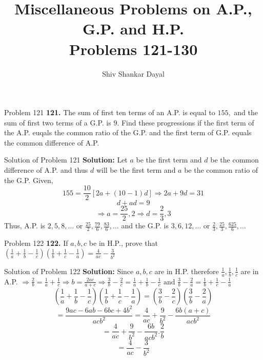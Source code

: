 \documentclass[aspectratio=1610,8pt]{beamer}
\title{Miscellaneous Problems on A.P., G.P. and H.P.\\Problems 121-130}
\author[Shiv Shankar Dayal]{Shiv Shankar Dayal}
\begin{document}
\begin{frame}
  \titlepage
\end{frame}
\begin{frame}{Problem 121}
  \textbf{121.} The sum of first ten terms of an A.P. is equal to $155,$ and the sum of first two terms of a G.P. is $9.$ Find
  these progressions if the first term of the A.P. euqals the common ratio of the G.P. and the first term of G.P. equals the common
  difference of A.P.
\end{frame}
\begin{frame}{Solution of Problem 121}
  \textbf{Solution:} Let $a$ be the first term and $d$ be the common difference of A.P. and thus $d$ will be the first term and $a$
  be the common ratio of the G.P. Given,
  $$155 = \frac{10}{2}[2a + (10 - 1)d] \Rightarrow 2a + 9d = 31$$
  $$d + ad = 9$$
  $$\Rightarrow a = \frac{25}{2}, 2 \Rightarrow d = \frac{2}{3}, 3$$
  Thus, A.P. is $2, 5, 8, \ldots$ or $\frac{25}{2}, \frac{79}{6}, \frac{83}{6}, \ldots$ and the G.P. is $3, 6, 12, \ldots$ or
  $\frac{2}{3}, \frac{25}{3}, \frac{625}{6}, \ldots$
\end{frame}
\begin{frame}{Problem 122}
  \textbf{122.} If $a, b, c$ be in H.P., prove that $\left(\frac{1}{a} + \frac{1}{b} - \frac{1}{c}\right)\left(\frac{1}{b} +
  \frac{1}{c} - \frac{1}{a}\right) = \frac{4}{ac} - \frac{3}{b^2}$
\end{frame}
\begin{frame}{Solution of Problem 122}
  \textbf{Solution:} Since $a, b, c$ are in H.P. therefore $\frac{1}{a}, \frac{1}{b}, \frac{1}{c}$ are in A.P.
  \linebreak\linebreak
  $\Rightarrow \frac{2}{b} = \frac{1}{a} + \frac{1}{c} \Rightarrow b = \frac{2ac}{a + c} \Rightarrow \frac{3}{b} - \frac{2}{c} =
  \frac{1}{a} + \frac{1}{b} - \frac{1}{c} \text{~and~}\frac{3}{b} - \frac{2}{a} = \frac{1}{b} + \frac{1}{c} - \frac{1}{a}$
  $$\left(\frac{1}{a} + \frac{1}{b} - \frac{1}{c}\right)\left(\frac{1}{b} + \frac{1}{c} - \frac{1}{a}\right) = \left(\frac{3}{b} -
  \frac{2}{c}\right)\left(\frac{3}{b} - \frac{2}{a}\right)$$
  $$= \frac{9ac - 6ab - 6bc + 4b^2}{acb^2} = \frac{4}{ac} + \frac{9}{b^2} - \frac{6b(a + c)}{acb^2}$$
  $$= \frac{4}{ac} + \frac{9}{b^2} - \frac{6b}{acb^2}.\frac{2}{b}$$
  $$= \frac{4}{ac} - \frac{3}{b^2}$$
\end{frame}
\end{document}
